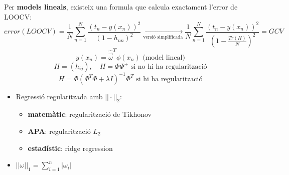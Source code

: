 \documentclass[a4paper]{article}
\begin{document}
Per \textbf{models lineals}, existeix una formula que calcula exactament l'error de LOOCV:
$$
error(LOOCV) = \frac{1}{N} \sum_{n=1}^N \frac{\left(t_n - y(x_n)\right)^2}{(1 - h_{nn})^2} \underset{\text{versió simplificada}}{\longrightarrow}
\frac{1}{N} \sum_{n=1}^N \frac{(t_n - y(x_n))^2}{\left(1 - \frac{Tr(H)}{N}\right)^2} = GCV
$$
$$
y(x_n) = \hat{\vec{\omega}}^T \phi (x_n) \text{ (model lineal)}
$$
$$
H = (h_{ij}), \quad H = \Phi \Phi^+ \text{ si no hi ha regularització}
$$
$$
H = \Phi \left( \Phi^T \Phi + \lambda I \right)^{-1} \Phi^T \text{ si hi ha regularització}
$$

\begin{itemize}
	\item Regressió regularitzada amb $||·||_2$:
	\begin{itemize}
		\item \textbf{matemàtic}: regularització de Tikhonov
		\item \textbf{APA}: regularització $L_2$
		\item \textbf{estadístic}: ridge regression
	\end{itemize}
	\item $||\omega||_1 = \sum_{i=1}^n |\omega_i|$
	
\end{itemize}
\end{document}
